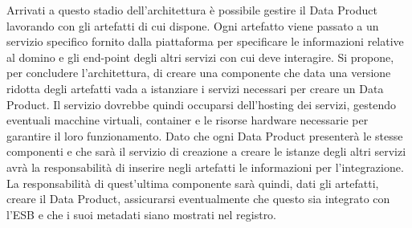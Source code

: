 \documentclass[a4paper,12pt]{report}
\begin{document}
Arrivati a questo stadio dell'architettura è possibile gestire il Data Product lavorando con gli artefatti di cui dispone.
Ogni artefatto viene passato a un servizio specifico fornito dalla piattaforma per specificare le informazioni relative al domino e gli end-point degli altri servizi con cui deve interagire.
Si propone, per concludere l'architettura, di creare una componente che data una versione ridotta degli artefatti vada a istanziare i servizi necessari per creare un Data Product.
Il servizio dovrebbe quindi occuparsi dell'hosting dei servizi, gestendo eventuali macchine virtuali, container e le risorse hardware necessarie per garantire il loro funzionamento. 
Dato che ogni Data Product presenterà le stesse componenti e che sarà il servizio di creazione a creare le istanze degli altri servizi avrà la responsabilità di inserire negli artefatti le informazioni per l'integrazione.
La responsabilità di quest'ultima componente sarà quindi, dati gli artefatti, creare il Data Product, assicurarsi eventualmente che questo sia integrato con l'ESB e che i suoi metadati siano mostrati nel registro.
\end{document}
